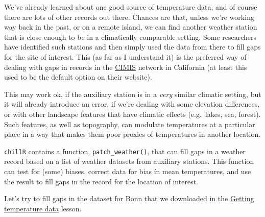 \documentclass[
]{book}
\newenvironment{Shaded}{\begin{snugshade}}{\end{snugshade}}
\newcommand{\DataTypeTok}[1]{\textcolor[rgb]{0.13,0.29,0.53}{#1}}
\newcommand{\DecValTok}[1]{\textcolor[rgb]{0.00,0.00,0.81}{#1}}
\newcommand{\KeywordTok}[1]{\textcolor[rgb]{0.13,0.29,0.53}{\textbf{#1}}}
\newcommand{\NormalTok}[1]{#1}
\newcommand{\OperatorTok}[1]{\textcolor[rgb]{0.81,0.36,0.00}{\textbf{#1}}}
\newcommand{\StringTok}[1]{\textcolor[rgb]{0.31,0.60,0.02}{#1}}
\begin{document}
We've already learned about one good source of temperature data, and of course there are lots of other records out there. Chances are that, unless we're working way back in the past, or on a remote island, we can find another weather station that is close enough to be in a climatically comparable setting. Some researchers have identified such stations and then simply used the data from there to fill gaps for the site of interest. This (as far as I understand it) is the preferred way of dealing with gaps in records in the \href{https://cimis.water.ca.gov/}{CIMIS} network in California (at least this used to be the default option on their website).

This may work ok, if the auxiliary station is in a \emph{very} similar climatic setting, but it will already introduce an error, if we're dealing with some elevation differences, or with other landscape features that have climatic effects (e.g.~lakes, sea, forest). Such features, as well as topography, can modulate temperatures at a particular place in a way that makes them poor proxies of temperatures in another location.

\texttt{chillR} contains a function, \texttt{patch\_weather()}, that can fill gaps in a weather record based on a list of weather datasets from auxiliary stations. This function can test for (some) biases, correct data for bias ín mean temperatures, and use the result to fill gaps in the record for the location of interest.

Let's try to fill gaps in the dataset for Bonn that we downloaded in the \protect\hyperlink{get_temp_data}{Getting temperature data} lesson.

\begin{Shaded}
\end{Shaded}
\end{document}
